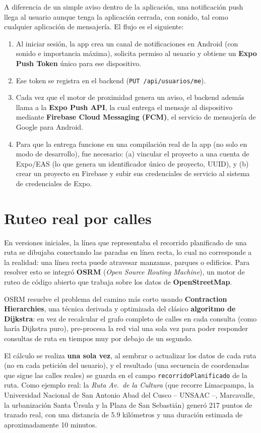 \documentclass[11pt,a4paper]{article}
\begin{document}
A diferencia de un simple aviso dentro de la aplicación, una notificación push llega al usuario aunque tenga la aplicación cerrada, con sonido, tal como cualquier aplicación de mensajería. El flujo es el siguiente:

\begin{enumerate}
    \item Al iniciar sesión, la app crea un canal de notificaciones en Android (con sonido e importancia máxima), solicita permiso al usuario y obtiene un \textbf{Expo Push Token} único para ese dispositivo.
    \item Ese token se registra en el backend (\texttt{PUT /api/usuarios/me}).
    \item Cada vez que el motor de proximidad genera un aviso, el backend además llama a la \textbf{Expo Push API}, la cual entrega el mensaje al dispositivo mediante \textbf{Firebase Cloud Messaging (FCM)}, el servicio de mensajería de Google para Android.
    \item Para que la entrega funcione en una compilación real de la app (no solo en modo de desarrollo), fue necesario: (a) vincular el proyecto a una cuenta de Expo/EAS (lo que genera un identificador único de proyecto, UUID), y (b) crear un proyecto en Firebase y subir sus credenciales de servicio al sistema de credenciales de Expo.
\end{enumerate}

\section{Ruteo real por calles}
\label{sec:ruteo}

En versiones iniciales, la línea que representaba el recorrido planificado de una ruta se dibujaba conectando las paradas en línea recta, lo cual no corresponde a la realidad: una línea recta puede atravesar manzanas, parques o edificios. Para resolver esto se integró \textbf{OSRM} (\textit{Open Source Routing Machine}), un motor de ruteo de código abierto que trabaja sobre los datos de \textbf{OpenStreetMap}.

OSRM resuelve el problema del camino más corto usando \textbf{Contraction Hierarchies}, una técnica derivada y optimizada del clásico \textbf{algoritmo de Dijkstra}: en vez de recalcular el grafo completo de calles en cada consulta (como haría Dijkstra puro), pre-procesa la red vial una sola vez para poder responder consultas de ruta en tiempos muy por debajo de un segundo.

El cálculo se realiza \textbf{una sola vez}, al sembrar o actualizar los datos de cada ruta (no en cada petición del usuario), y el resultado (una secuencia de coordenadas que sigue las calles reales) se guarda en el campo \texttt{recorridoPlanificado} de la ruta. Como ejemplo real: la \emph{Ruta Av.\ de la Cultura} (que recorre Limacpampa, la Universidad Nacional de San Antonio Abad del Cusco -- UNSAAC --, Marcavalle, la urbanización Santa Úrsula y la Plaza de San Sebastián) generó 217 puntos de trazado real, con una distancia de 5.9 kilómetros y una duración estimada de aproximadamente 10 minutos.
\end{document}
